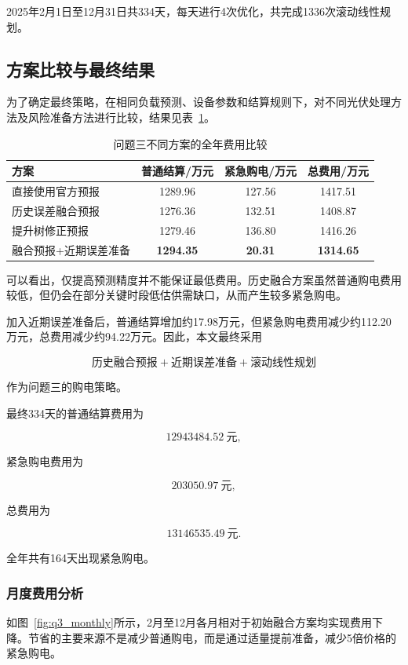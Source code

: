 2025年2月1日至12月31日共334天，每天进行4次优化，共完成1336次滚动线性规划。


\subsection{方案比较与最终结果}

为了确定最终策略，在相同负载预测、设备参数和结算规则下，对不同光伏处理方法及风险准备方法进行比较，结果见表~\ref{tab:q3_compare}。

\begin{table}[htbp]
\centering
\caption{问题三不同方案的全年费用比较}
\label{tab:q3_compare}
\begin{tabular}{lccc}
\hline
方案 & 普通结算/万元 & 紧急购电/万元 & 总费用/万元 \\
\hline
直接使用官方预报 & 1289.96 & 127.56 & 1417.51 \\
历史误差融合预报 & 1276.36 & 132.51 & 1408.87 \\
提升树修正预报 & 1279.46 & 136.80 & 1416.26 \\
融合预报+近期误差准备 & \textbf{1294.35} & \textbf{20.31} & \textbf{1314.65} \\
\hline
\end{tabular}
\end{table}

可以看出，仅提高预测精度并不能保证最低费用。历史融合方案虽然普通购电费用较低，但仍会在部分关键时段低估供需缺口，从而产生较多紧急购电。

加入近期误差准备后，普通结算增加约17.98万元，但紧急购电费用减少约112.20万元，总费用减少约94.22万元。因此，本文最终采用

\[
\boxed{
\text{历史融合预报}
+
\text{近期误差准备}
+
\text{滚动线性规划}
}
\]

作为问题三的购电策略。

最终334天的普通结算费用为

\[
12943484.52\ \mathrm{元},
\]

紧急购电费用为

\[
203050.97\ \mathrm{元},
\]

总费用为

\[
\boxed{13146535.49\ \mathrm{元}}.
\]

全年共有164天出现紧急购电。

\subsubsection*{月度费用分析}

如图~\ref{fig:q3_monthly}所示，2月至12月各月相对于初始融合方案均实现费用下降。节省的主要来源不是减少普通购电，而是通过适量提前准备，减少5倍价格的紧急购电。

